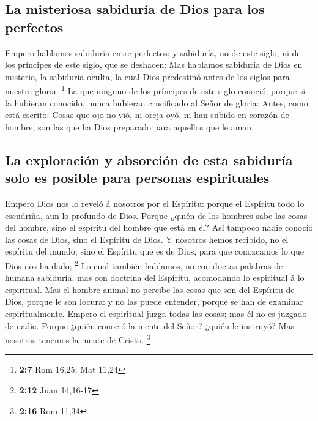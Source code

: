 \hypertarget{la-misteriosa-sabiduruxeda-de-dios-para-los-perfectos}{%
\subsection{La misteriosa sabiduría de Dios para los
perfectos}\label{la-misteriosa-sabiduruxeda-de-dios-para-los-perfectos}}

 Empero hablamos sabiduría entre perfectos; y sabiduría,
no de este siglo, ni de los príncipes de este siglo, que se deshacen:
 Mas hablamos sabiduría de Dios en misterio, la sabiduría
oculta, la cual Dios predestinó antes de los siglos para nuestra gloria:
\footnote{\textbf{2:7} Rom 16,25; Mat 11,24}  La que
ninguno de los príncipes de este siglo conoció; porque si la hubieran
conocido, nunca hubieran crucificado al Señor de gloria: 
Antes, como está escrito: Cosas que ojo no vió, ni oreja oyó, ni han
subido en corazón de hombre, son las que ha Dios preparado para aquellos
que le aman.

\hypertarget{la-exploraciuxf3n-y-absorciuxf3n-de-esta-sabiduruxeda-solo-es-posible-para-personas-espirituales}{%
\subsection{La exploración y absorción de esta sabiduría solo es posible
para personas
espirituales}\label{la-exploraciuxf3n-y-absorciuxf3n-de-esta-sabiduruxeda-solo-es-posible-para-personas-espirituales}}

 Empero Dios nos lo reveló á nosotros por el Espíritu:
porque el Espíritu todo lo escudriña, aun lo profundo de Dios.
 Porque ¿quién de los hombres sabe las cosas del hombre,
sino el espíritu del hombre que está en él? Así tampoco nadie conoció
las cosas de Dios, sino el Espíritu de Dios.  Y nosotros
hemos recibido, no el espíritu del mundo, sino el Espíritu que es de
Dios, para que conozcamos lo que Dios nos ha dado; \footnote{\textbf{2:12}
  Juan 14,16-17}  Lo cual también hablamos, no con doctas
palabras de humana sabiduría, mas con doctrina del Espíritu, acomodando
lo espiritual á lo espiritual.  Mas el hombre animal no
percibe las cosas que son del Espíritu de Dios, porque le son locura: y
no las puede entender, porque se han de examinar espiritualmente.
 Empero el espiritual juzga todas las cosas; mas él no es
juzgado de nadie.  Porque ¿quién conoció la mente del
Señor? ¿quién le instruyó? Mas nosotros tenemos la mente de Cristo.
\footnote{\textbf{2:16} Rom 11,34}

